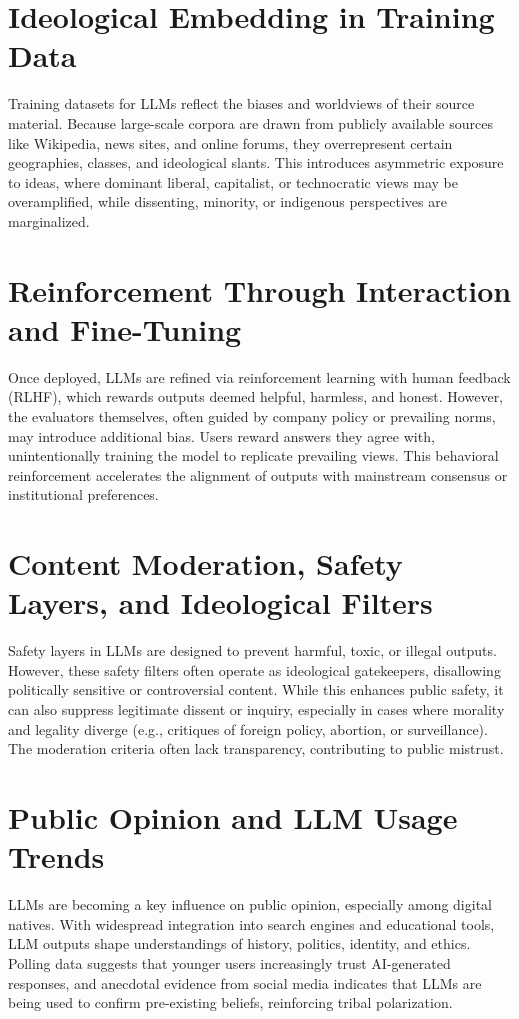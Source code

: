 \documentclass[11pt]{article}
\begin{document}
\section{Ideological Embedding in Training Data}
Training datasets for LLMs reflect the biases and worldviews of their source material. Because large-scale corpora are drawn from publicly available sources like Wikipedia, news sites, and online forums, they overrepresent certain geographies, classes, and ideological slants. This introduces asymmetric exposure to ideas, where dominant liberal, capitalist, or technocratic views may be overamplified, while dissenting, minority, or indigenous perspectives are marginalized.

\section{Reinforcement Through Interaction and Fine-Tuning}
Once deployed, LLMs are refined via reinforcement learning with human feedback (RLHF), which rewards outputs deemed helpful, harmless, and honest. However, the evaluators themselves, often guided by company policy or prevailing norms, may introduce additional bias. Users reward answers they agree with, unintentionally training the model to replicate prevailing views. This behavioral reinforcement accelerates the alignment of outputs with mainstream consensus or institutional preferences.

\section{Content Moderation, Safety Layers, and Ideological Filters}
Safety layers in LLMs are designed to prevent harmful, toxic, or illegal outputs. However, these safety filters often operate as ideological gatekeepers, disallowing politically sensitive or controversial content. While this enhances public safety, it can also suppress legitimate dissent or inquiry, especially in cases where morality and legality diverge (e.g., critiques of foreign policy, abortion, or surveillance). The moderation criteria often lack transparency, contributing to public mistrust.

\section{Public Opinion and LLM Usage Trends}
LLMs are becoming a key influence on public opinion, especially among digital natives. With widespread integration into search engines and educational tools, LLM outputs shape understandings of history, politics, identity, and ethics. Polling data suggests that younger users increasingly trust AI-generated responses, and anecdotal evidence from social media indicates that LLMs are being used to confirm pre-existing beliefs, reinforcing tribal polarization.
\end{document}
